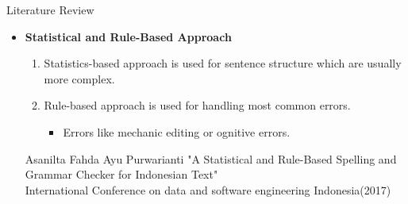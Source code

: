 \documentclass{beamer}
\begin{document}
\begin{frame}{Literature Review}
\begin{itemize}
	\vspace{2em}
	\item \textbf{Statistical and Rule-Based Approach} \\
	\vspace{1em}
	\begin{enumerate}
		\item Statistics-based approach is used for sentence structure which are usually more complex. \\
		\vspace{1em}
		\item Rule-based approach is used for handling most common errors.   \\ 
		\begin{itemize}
			\item Errors like mechanic editing or ognitive errors.\\	
		\end{itemize}
		\vspace{4em}
	\end{enumerate}
	\footnotesize \color{blue}Asanilta Fahda Ayu Purwarianti 
	\color{black} {"A Statistical and Rule-Based Spelling and Grammar Checker for Indonesian Text"}\\
	\color{blue} International Conference on data and software engineering Indonesia(2017)
\end{itemize}
\end{frame}
\end{document}
